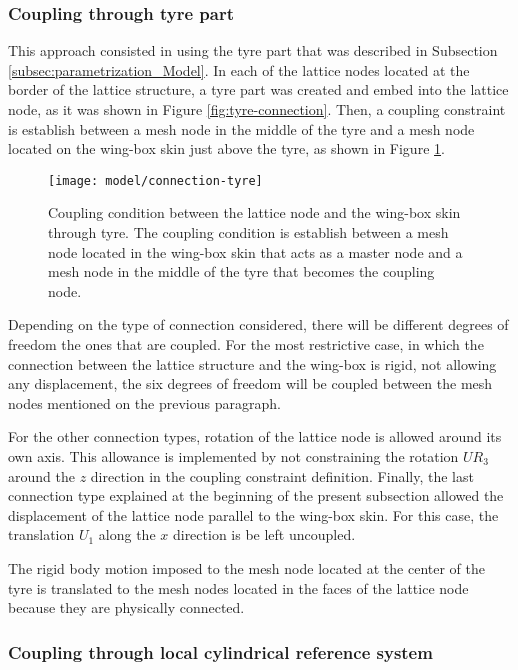     \subsubsection{Coupling through tyre part}

    This approach consisted in using the tyre part that was described in Subsection \ref{subsec:parametrization_Model}. In each of the lattice nodes located at the border of the lattice structure, a tyre part was created and embed into the lattice node, as it was shown in Figure \ref{fig:tyre-connection}. Then, a coupling constraint is establish between a mesh node in the middle of the tyre and a mesh node located on the wing-box skin just above the tyre, as shown in Figure \ref{fig:connection-tyre}.

    \begin{figure}[!htpb]
      \centering
      \texttt{[image: model/connection-tyre]}
      \caption[Coupling condition between the lattice node and the wing-box skin through tyre]{Coupling condition between the lattice node and the wing-box skin through tyre. The coupling condition is establish between a mesh node located in the wing-box skin that acts as a master node and a mesh node in the middle of the tyre that becomes the coupling node.}\label{fig:connection-tyre}
    \end{figure}

    Depending on the type of connection considered, there will be different degrees of freedom the ones that are coupled. For the most restrictive case, in which the connection between the lattice structure and the wing-box is rigid, not allowing any displacement, the six degrees of freedom will be coupled between the mesh nodes mentioned on the previous paragraph.

    For the other connection types, rotation of the lattice node is allowed around its own axis. This allowance is implemented by not constraining the rotation $UR_3$ around the $z$ direction in the coupling constraint definition. Finally, the last connection type explained at the beginning of the present subsection allowed the displacement of the lattice node parallel to the wing-box skin. For this case, the translation $U_1$ along the $x$ direction is be left uncoupled.

    The rigid body motion imposed to the mesh node located at the center of the tyre is translated to the mesh nodes located in the faces of the lattice node because they are physically connected.

    \subsubsection{Coupling through local cylindrical reference system}

